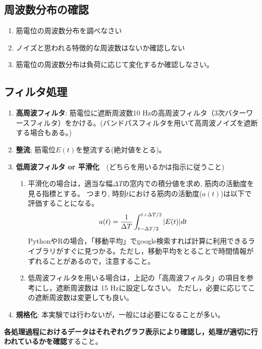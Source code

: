 \documentclass{jsarticle}
\begin{document}
\subsection{周波数分布の確認}

\begin{enumerate}
\item 筋電位の周波数分布を調べなさい
\item ノイズと思われる特徴的な周波数はないか確認しない
\item 筋電位の周波数分布は負荷に応じて変化するか確認しなさい。
\end{enumerate}

\subsection{フィルタ処理}

\begin{enumerate}
\item \textbf{高周波フィルタ}: 筋電位に遮断周波数10 Hzの高周波フィルタ（3次バターワースフィルタ）をかける。(バンドパスフィルタを用いて高周波ノイズを遮断する場合もある。)
\item \textbf{整流}; 筋電位$E(t)$を整流する(絶対値をとる)。
\item \textbf{低周波フィルタ or 平滑化}　(どちらを用いるかは指示に従うこと)
  \begin{enumerate}
    \item 平滑化の場合は，適当な幅$\Delta T$の窓内での積分値を求め, 筋肉の活動度を見る指標とする。
    つまり, 時刻$t$における筋肉の活動度($a(t)$)は以下で評価することになる。
    \begin{align}
      a(t)=\frac{1}{\Delta T}\int_{t-\Delta T/2}^{t+\Delta T/2}|E(t)|dt\notag
    \end{align}
    PythonやRの場合，「移動平均」でgoogle検索すれば計算に利用できるライブラリがすぐに見つかる。ただし，移動平均をとることで時間情報がずれることがあるので，注意すること。
    \item 低周波フィルタを用いる場合は，上記の「高周波フィルタ」の項目を参考にし，遮断周波数は 15 Hzに設定しなさい。 
    ただし，必要に応じてこの遮断周波数は変更しても良い。
  \end{enumerate}
\item \textbf{規格化}: 本実験では行わないが，一般には必要になることが多い。
\end{enumerate}

\textbf{各処理過程におけるデータはそれぞれグラフ表示により確認し，処理が適切に行われているかを確認}すること。
\end{document}
